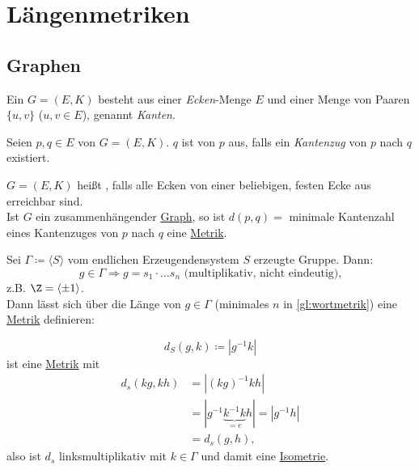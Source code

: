 \chapter{Längenmetriken}

\section{Graphen}

\begin{definition}[Graph]\label{def:graph}
  Ein  \( G = (E, K) \) besteht aus einer \emph{Ecken}-Menge \( E \) und einer Menge von Paaren \( \{ u, v \} \) (\( u, v \in E \)), genannt \emph{Kanten}.
\end{definition}

\begin{definition}[Erreichbarkeit]
  Seien \( p, q \in E \) von \( G = (E, K) \). \( q \) ist  von \( p \) aus, falls ein \emph{Kantenzug} von \( p \) nach \( q \) existiert.
\end{definition}

\begin{definition}[Zusammenhängend]
  \( G = (E, K) \) heißt , falls alle Ecken von einer beliebigen, festen Ecke aus erreichbar sind.
  \\
  Ist \( G \) ein zusammenhängender \hyperref[def:graph]{Graph}, so ist \( d(p, q) = \) minimale Kantenzahl eines Kantenzuges von \( p \) nach \( q \) eine \hyperref[def:metrik]{Metrik}.
\end{definition}

\begin{example}[Wortmetrik]
  Sei \( \Gamma \coloneqq \langle S \rangle \) vom endlichen Erzeugendensystem \( S \) erzeugte Gruppe. Dann:
  \begin{equation}
    \label{gl:wortmetrik}
    g \in \Gamma \Rightarrow g = s_1\cdot \dots s_n\text{ (multiplikativ, nicht eindeutig),}
  \end{equation}
  z.B. \( \Z = \langle \pm 1 \rangle \). \\
  Dann lässt sich über die Länge von \( g \in \Gamma \) (minimales \( n \) in \autoref{gl:wortmetrik}) eine \hyperref[def:metrik]{Metrik} definieren:
\end{example}

\begin{definition}[Wortmetrik]\label{def:wortmetrik}
  \begin{equation*}
    d_S(g, k) \coloneqq |g^{-1}k|
  \end{equation*}
  ist eine \hyperref[def:metrik]{Metrik} mit
  \begin{align*}
    d_s(kg,kh) &= |{(kg)}^{-1}kh| \\ 
    &= |g^{-1}\underbrace{k^{-1}k}_{=e}h| = |g^{-1}h| \\
    &= d_s(g,h)\text{,}
  \end{align*}
  also ist \( d_s \) linksmultiplikativ mit \( k \in \Gamma \) und damit eine \hyperref[def:isometrie]{Isometrie}.
\end{definition}

